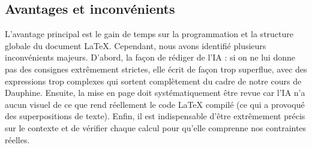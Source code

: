 \documentclass[11pt,a4paper]{article}
\begin{document}
\subsection{Avantages et inconvénients}
L'avantage principal est le gain de temps sur la programmation et la structure globale du document LaTeX. Cependant, nous avons identifié plusieurs inconvénients majeurs. D'abord, la façon de rédiger de l'IA : si on ne lui donne pas des consignes extrêmement strictes, elle écrit de façon trop superflue, avec des expressions trop complexes qui sortent complètement du cadre de notre cours de Dauphine. Ensuite, la mise en page doit systématiquement être revue car l'IA n'a aucun visuel de ce que rend réellement le code LaTeX compilé (ce qui a provoqué des superpositions de texte). Enfin, il est indispensable d'être extrêmement précis sur le contexte et de vérifier chaque calcul pour qu'elle comprenne nos contraintes réelles.
\end{document}
